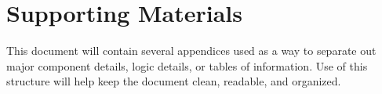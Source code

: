 
\chapter{Supporting Materials}
This document will contain several appendices used as a way to separate out major 
component details, logic details, or tables of information.  Use of this structure 
will help keep the document clean, readable, and organized. 

